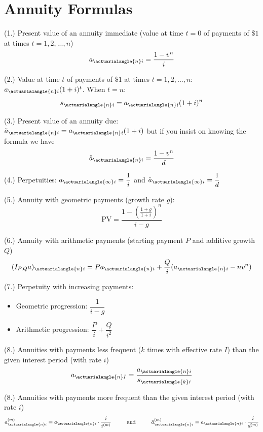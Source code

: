 \documentclass[12pt]{article}
\begin{document}
\section{Annuity Formulas}

(1.) Present value of an annuity immediate (value at time $t=0$ of payments of $\$1$ at times $t=1,2,...,n$) \[a_{\actuarialangle{n}i} = \dfrac{1-v^n}{i}\]

(2.) Value at time $t$ of payments of $\$1$ at times $t = 1,2,...,n$: $a_{\actuarialangle{n}i} (1+i)^t$. When $t =n$: \[s_{\actuarialangle{n}i}=a_{\actuarialangle{n}i }(1+i)^n\]

(3.) Present value of an annuity due: $\ddot{a}_{\actuarialangle{n}i   } = a_{\actuarialangle{n}i  } (1+i)$ but if you insist on knowing the formula we have \[\ddot{a}_{\actuarialangle{n}i} = \dfrac{1-v^n}{d}\]

(4.) Perpetuities: $a_{\actuarialangle{\infty}i} = \dfrac{1}{i}$ and $\ddot{a}_{\actuarialangle{\infty}i} = \dfrac{1}{d}$

(5.) Annuity with geometric payments (growth rate $g$):\[\text{PV}=\dfrac{1-\left(\frac{1+g}{1+i}\right)^n}{i-g}\]

(6.) Annuity with arithmetic payments (starting payment $P$ and additive growth $Q$) \[(I_{P,Q}a)_{\actuarialangle{n}i} = Pa_{\actuarialangle{n}i   }+\frac{Q}{i}(a_{\actuarialangle{n}i}-nv^n)\]

(7.) Perpetuity with increasing payments:
\vspace{-.5cm}

\begin{itemize}
    \item Geometric progression: $\dfrac{1}{i-g}$
    \item Arithmetic progression: $\dfrac{P}{i}+\dfrac{Q}{i^2}$
\end{itemize}

(8.) Annuities with payments less frequent ($k$ times with effective rate $I$) than the given interest period (with rate $i$) \[a_{\actuarialangle{n}I} = \dfrac{a_{\actuarialangle{n}i}}{s_{\actuarialangle{k}i}}\]

(8.) Annuities with payments more frequent than the given interest period (with rate $i$) \[a^{(m)}_{\actuarialangle{n}i} = a_{\actuarialangle{n}i} \cdot \dfrac{i}{i^{(m)}} \hspace{1cm} \text{and} \hspace{1cm} \ddot{a}^{(m)}_{\actuarialangle{n}i} = a_{\actuarialangle{n}i} \cdot \dfrac{i}{d^{(m)}}\]
\end{document}
